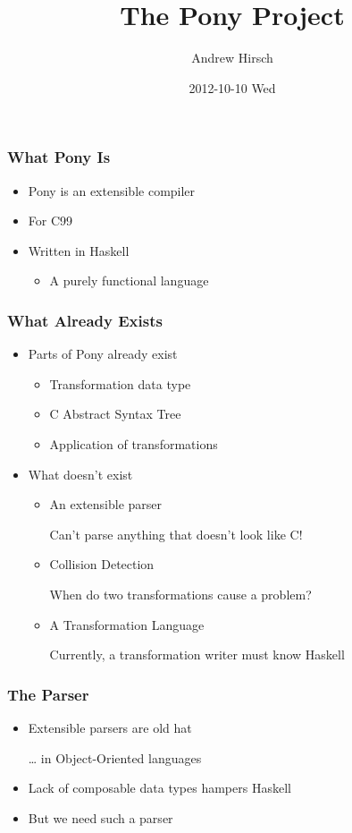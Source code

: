 \documentclass[bigger]{beamer}
\institute{GWU}
\title{The Pony Project}
\author{Andrew Hirsch}
\date{2012-10-10 Wed}
\begin{document}
\maketitle


\begin{frame}
\frametitle{What Pony Is}
\label{sec-1}


\begin{itemize}
\item Pony is an extensible compiler
\item For C99
\item Written in Haskell
\begin{itemize}
\item A purely functional language
\end{itemize}
\end{itemize}
\end{frame}
\begin{frame}
\frametitle{What Already Exists}
\label{sec-2}


\begin{itemize}
\item Parts of Pony already exist
\begin{itemize}
\item Transformation data type
\item C Abstract Syntax Tree
\item Application of transformations
\end{itemize}
\item What doesn't exist
\begin{itemize}
\item An extensible parser 
    
    Can't parse anything that doesn't look like C!
\item Collision Detection
    
    When do two transformations cause a problem?
\item A Transformation Language
    
    Currently, a transformation writer must know Haskell
\end{itemize}
\end{itemize}
\end{frame}
\begin{frame}
\frametitle{The Parser}
\label{sec-3}


\begin{itemize}
\item Extensible parsers are old hat

    \ldots{} in Object-Oriented languages
\item Lack of composable data types hampers Haskell
\item But we need such a parser
\end{itemize}
\end{frame}
\end{document}
